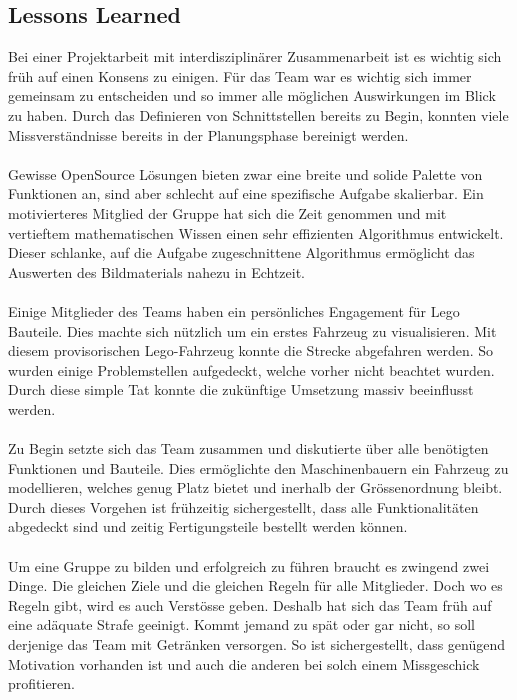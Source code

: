 \subsection{Lessons Learned}

Bei einer Projektarbeit mit interdisziplinärer Zusammenarbeit ist es wichtig sich früh auf einen Konsens zu einigen.
Für das Team war es wichtig sich immer gemeinsam zu entscheiden und so immer alle möglichen Auswirkungen im Blick zu haben.
Durch das Definieren von Schnittstellen bereits zu Begin, konnten viele Missverständnisse bereits in der Planungsphase bereinigt werden.
\\
\\
Gewisse OpenSource Lösungen bieten zwar eine breite und solide Palette von Funktionen an, sind aber schlecht auf eine spezifische Aufgabe skalierbar.
Ein motivierteres Mitglied der Gruppe hat sich die Zeit genommen und mit vertieftem mathematischen Wissen einen sehr effizienten Algorithmus entwickelt.
Dieser schlanke, auf die Aufgabe zugeschnittene Algorithmus ermöglicht das Auswerten des Bildmaterials nahezu in Echtzeit.
\\
\\
Einige Mitglieder des Teams haben ein persönliches Engagement für Lego Bauteile. Dies machte sich nützlich um ein erstes Fahrzeug zu visualisieren.
Mit diesem provisorischen Lego-Fahrzeug konnte die Strecke abgefahren werden. So wurden einige Problemstellen aufgedeckt, welche vorher nicht beachtet wurden. Durch diese simple Tat konnte die zukünftige Umsetzung massiv beeinflusst werden.
\\
\\
Zu Begin setzte sich das Team zusammen und diskutierte über alle benötigten Funktionen und Bauteile.
Dies ermöglichte den Maschinenbauern ein Fahrzeug zu modellieren, welches genug Platz bietet und inerhalb der Grössenordnung bleibt.
Durch dieses Vorgehen ist frühzeitig sichergestellt, dass alle Funktionalitäten abgedeckt sind und zeitig Fertigungsteile bestellt werden können.
\\
\\
Um eine Gruppe zu bilden und erfolgreich zu führen braucht es zwingend zwei Dinge.
Die gleichen Ziele und die gleichen Regeln für alle Mitglieder.
Doch wo es Regeln gibt, wird es auch Verstösse geben. Deshalb hat sich das Team früh auf eine adäquate Strafe geeinigt.
Kommt jemand zu spät oder gar nicht, so soll derjenige das Team mit Getränken versorgen.
So ist sichergestellt, dass genügend Motivation vorhanden ist und auch die anderen bei solch einem Missgeschick profitieren.